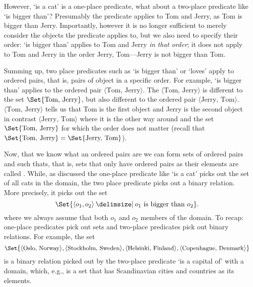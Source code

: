 However, `is a cat' is a one-place predicate, what about a two-place predicate like `is bigger than'?  Presumably the predicate applies to Tom and Jerry, as Tom is bigger than Jerry. Importantly, however it is no longer sufficient to merely consider the objects the predicate applies to, but we also need to specify their order: `is bigger than' applies to Tom and Jerry \emph{in that order}; it does not apply to Tom and Jerry in the order Jerry, Tom---Jerry is not bigger than Tom. 

Summing up, two place predicates such as `is bigger than' or `loves' apply to ordered pairs, that is, pairs of object in a specific order. For example, `is bigger than' applies to the ordered pair $\langle\text{Tom, Jerry}\rangle$. 
The  $\langle\text{Tom, Jerry}\rangle$ is different to the set $\Set{\text{Tom, Jerry}}$, but also different to the ordered pair $\langle\text{Jerry, Tom}\rangle$. 
$\langle\text{Tom, Jerry}\rangle$ tells us that Tom is the first object and Jerry is the second object in contrast $\langle\text{Jerry, Tom}\rangle$ where it is the other way around and the set 
$\Set{\text{Tom, Jerry}}$ for which the order does not matter (recall that $\Set{\text{Tom, Jerry}}=\Set{\text{Jerry, Tom}}$). 

Now, that we know what an ordered pairs are we can form sets of ordered pairs and such thats, that is, sets that only have ordered pairs as their elements are called . While, as discussed the one-place predicate like `is a cat' picks out the set of all cats in the domain, the two place predicate picks out a binary relation. More precisely, it picks out the set
$$\Set{\langle o_1,o_2\rangle \given o_1\text{ is bigger than }o_2}.$$
where we always assume that both $o_1$ and $o_2$ members of the domain. To recap: one-place predicates pick out sets and two-place predicates pick out binary relations. For example, the set
$${\small \Set{\langle\text{Oslo, Norway}\rangle,\langle\text{Stockholm, Sweden}\rangle,\langle\text{Helsinki, Finland}\rangle,\langle\text{Copenhague, Denmark}\rangle}}$$
is a binary relation picked out by the two-place predicate `is a capital of' with a domain, which, e.g., is a set that has Scandinavian cities and countries as its elements.

